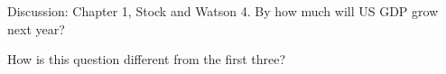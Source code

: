 \documentclass{./../div_teaching_slides}
\begin{document}
\begin{frame}{Discussion: Chapter 1, Stock and Watson}
4. By how much will US GDP grow next year? \\ \vspace{0.5em}
\begin{witemize}
  \item How is this question different from the first three? 
\end{witemize}
\end{frame}


\end{document}
